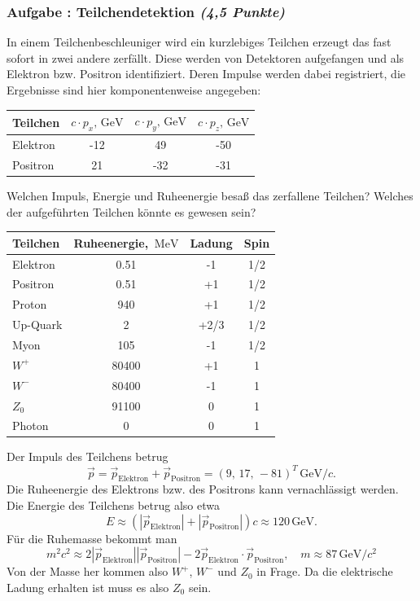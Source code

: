 \documentclass[12pt,a4paper]{article}
\newcommand{\unit}[1]{\,\mathrm{#1}}
\newcounter{numlabel}
\newenvironment{problem}[2]{\stepcounter{numlabel} \vspace{1ex} \subsubsection*{Aufgabe \the\value{numlabel}: #1 \emph{(#2 Punkte)}} \renewcommand{\Currentlabel}{Aufgabe \the\value{numlabel}: #1}}{

}
\begin{document}
\begin{problem}{Teilchendetektion}{4,5}
In einem Teilchenbeschleuniger wird ein kurzlebiges Teilchen erzeugt das fast sofort in zwei andere zerfällt. Diese werden von Detektoren aufgefangen und als Elektron bzw. Positron identifiziert. Deren Impulse werden dabei registriert, die Ergebnisse sind hier komponentenweise angegeben:
\begin{center}
\begin{tabular}{lccc}
\toprule
Teilchen & $c \cdot p_x, \unit{GeV}$ & $c \cdot p_y, \unit{GeV}$ & $c \cdot p_z, \unit{GeV}$ \\
\midrule
Elektron & -12 & 49 & -50 \\
Positron & 21 & -32 & -31 \\
\bottomrule
\end{tabular}
\end{center}
Welchen Impuls, Energie und Ruheenergie besaß das zerfallene Teilchen? Welches der aufgeführten Teilchen könnte es gewesen sein?
\begin{center}
\begin{tabular}{lccc}
\toprule
Teilchen & Ruheenergie, $\unit{MeV}$ & Ladung & Spin \\
\midrule
Elektron & 0.51 & -1 & 1/2 \\
Positron & 0.51 & +1 & 1/2 \\
Proton & 940 & +1 & 1/2 \\
Up-Quark & 2 & +2/3 & 1/2 \\
Myon & 105 & -1 & 1/2 \\
$W^+$ & 80400 & +1 & 1 \\
$W^-$ & 80400 & -1 & 1 \\
$Z_0$ & 91100 & 0 & 1 \\
Photon & 0 & 0 & 1 \\
\bottomrule
\end{tabular}
\end{center}
\begin{solution}
Der Impuls des Teilchens betrug
\[
\vec p = \vec p_\mathrm{Elektron} + \vec p_\mathrm{Positron} = (9,\, 17,\, -81)^T \unit{GeV}/c.
\]
Die Ruheenergie des Elektrons bzw. des Positrons kann vernachlässigt werden. Die Energie des Teilchens betrug also etwa
\[
E \approx (|\vec p_\mathrm{Elektron}| + |\vec p_\mathrm{Positron}|) c \approx 120 \unit{GeV}.
\]
Für die Ruhemasse bekommt man
\[
m^2 c^2 \approx 2 |\vec p_\mathrm{Elektron}|  |\vec p_\mathrm{Positron}| - 2 \vec p_\mathrm{Elektron} \cdot \vec p_\mathrm{Positron}, \quad m \approx 87 \unit{GeV} / c^2
\]
Von der Masse her kommen also $W^+$, $W^-$ und $Z_0$ in Frage. Da die elektrische Ladung erhalten ist muss es also $Z_0$ sein.
\end{solution}
\end{problem}
\end{document}
